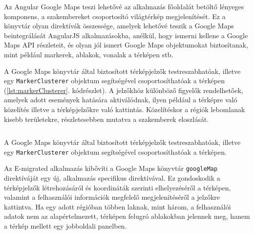 Az Angular Google Maps teszi lehetővé az alkalmazás főoldalát betöltő lényeges komponens, a szakembereket csoportosító világtérkép megjelenítését. Ez a könyvtár olyan direktívák összessége, amelyek lehetővé teszik a Google Maps beintegrálását AngularJS alkalmazásokba, anélkül, hogy ismerni kellene a Google Maps API részleteit, és olyan jól ismert Google Maps objektumokat biztosítanak, mint például markerek, ablakok, vonalak a térképen stb. \cite{AngularGoogleMap}

A Google Maps könyvtár által biztosított térképjelzők testreszabhatóak, illetve egy \texttt{MarkerClusterer} objektum segítségével csoportosíthatóak a térképen (\ref{lst:markerClusterer}. kódrészlet). A jelzőkhöz különböző figyelők rendelhetőek, amelyek adott események hatására aktiválódnak, ilyen például a térképre való közelítés illetve a térképjelzőkre való kattintás. Közelítéskor a régiók lebomlanak kisebb területekre, részletesebben mutatva a szakemberek eloszlását. 
\begin{listing}
  \inputminted[fontsize=\small]{java}{progfiles/MarkerClusterer.js}
  \caption{A Google Maps könyvtár által biztosított térképjelzők testreszabhatóak, illetve egy \texttt{MarkerClusterer} objektum segítségével csoportosíthatóak a térképen.}
  \label{lst:markerClusterer}
\end{listing}

Az E-migrated alkalmazás kibővíti a Google Maps könyvtár \texttt{googleMap} direktíváját egy új, alkalmazás specifikus direktívával. Ez gondoskodik a térképjelzők létrehozásáról és koordináták szerinti elhelyezéséről a térképen, valamint a felhasználói információk megfelelő megjelenítéséről a jelzőkre kattintva. Ha egy adott régióban többen laknak, mint három, a felhasználói adatok nem az alapértelmezett, térképen felugró ablakokban jelennek meg, hanem a térkép mellett egy jobboldali panelben. 





 